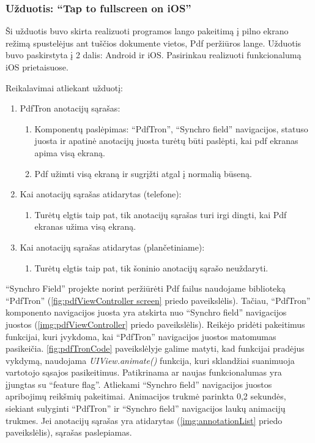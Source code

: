 \subsubsection{Užduotis: \enquote{Tap to fullscreen on iOS}}

Ši užduotis buvo skirta realizuoti programos lango pakeitimą į pilno ekrano režimą spustelėjus ant tuščios dokumente vietos, Pdf peržiūros lange. Užduotis buvo paskirstyta į 2 dalis: Android ir iOS. Pasirinkau realizuoti funkcionalumą iOS prietaisuose.

Reikalavimai atliekant užduotį:

\begin{enumerate}
    \item PdfTron anotacijų sąrašas:
    \begin{enumerate}
        \item Komponentų paslėpimas: \enquote{PdfTron}, \enquote{Synchro field} navigacijos, statuso juosta ir apatinė anotacijų juosta turėtų būti paslėpti, kai pdf ekranas apima visą ekraną.
        \item Pdf užimti visą ekraną ir sugrįžti atgal į normalią būseną.
    \end{enumerate}
    \item Kai anotacijų sąrašas atidarytas (telefone):
    \begin{enumerate}
        \item Turėtų elgtis taip pat, tik anotacijų sąrašas turi irgi dingti, kai Pdf ekranas užima visą ekraną.
    \end{enumerate}
    \item Kai anotacijų sąrašas atidarytas (plančetiniame):
    \begin{enumerate}
        \item Turėtų elgtis taip pat, tik šoninio anotacijų sąrašo neuždaryti.
    \end{enumerate}
\end{enumerate}


\enquote{Synchro Field} projekte norint peržiūrėti Pdf failus naudojame biblioteką \enquote{PdfTron} (\ref{fig:pdfViewController screen} priedo paveikslėlis). Tačiau, \enquote{PdfTron} komponento navigacijos juosta yra atskirta nuo \enquote{Synchro field} navigacijos juostos (\ref{img:pdfViewController} priedo paveikslėlis). Reikėjo pridėti pakeitimus funkcijai, kuri įvykdoma, kai \enquote{PdfTron} navigacijos juostos matomumas pasikeičia. \ref{fig:pdfTronCode} paveikslėlyje galime matyti, kad funkcijai pradėjus vykdymą, naudojama \textit{UIView.animate()} funkcija, kuri sklandžiai suanimuoja vartotojo sąsajos pasikeitimus. Patikrinama ar naujas funkcionalumas yra įjungtas su \enquote{feature flag}. Atliekami \enquote{Synchro field} navigacijos juostos apribojimų reikšmių pakeitimai. Animacijos trukmė parinkta 0,2 sekundės, siekiant sulyginti \enquote{PdfTron} ir \enquote{Synchro field} navigacijos laukų animacijų trukmes. Jei anotacijų sąrašas yra atidarytas (\ref{img:annotationList} priedo paveikslėlis), sąrašas paslepiamas.

